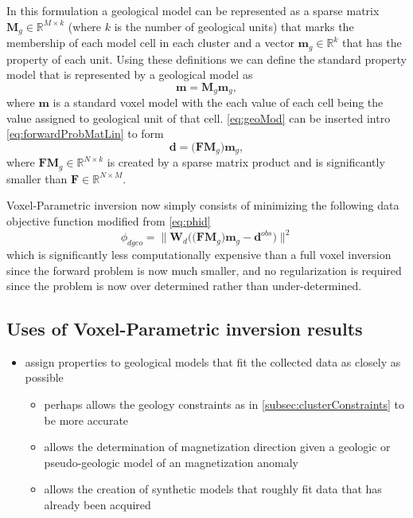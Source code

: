 In this formulation a geological model can be represented as a sparse matrix $\mathbf{M}_g \in \mathbb R^{M\times k}$ (where $k$ is the number of geological units) that marks the membership of each model cell in each cluster and a vector $\mathbf m_g \in \mathbb R^{k}$ that has the property of each unit. Using these definitions we can define the standard property model that is represented by a geological model as
\begin{equation}
\mathbf m = \mathbf M_g\mathbf m_g, \label{eq:geoMod}
\end{equation}
where $\mathbf m$ is a standard voxel model with the each value of each cell being the value assigned to geological unit of that cell. \autoref{eq:geoMod} can be inserted intro \autoref{eq:forwardProbMatLin} to form 
\begin{equation}
\mathbf d = \big(\mathbf F\mathbf M_g\big)\mathbf m_g, \label{eq:forwardProbMatLinGeo}
\end{equation}
where $\mathbf F\mathbf M_g \in \mathbb R^{N\times k}$ is created by a sparse matrix product and is significantly smaller than $\mathbf F \in \mathbb R^{N\times M}$.

Voxel-Parametric inversion now simply consists of minimizing the following data objective function modified from \autoref{eq:phid}
\begin{equation}
\phi_{d geo} =\|\mathbf W_d\Big(\big(\mathbf F\mathbf M_g\big)\mathbf m_g - \mathbf d^{obs}\Big)\|^2
\end{equation}
\label{eq:phidGeo}
which is significantly less computationally expensive than a full voxel inversion since the forward problem is now much smaller, and no regularization is required since the problem is now over determined rather than under-determined.

\subsection{Uses of Voxel-Parametric inversion results}
\label{subsec:voxelParamUses}

 \begin{itemize}
  \item assign properties to geological models that fit the collected data as closely as possible
  \begin{itemize}
   \item perhaps allows the geology constraints as in \autoref{subsec:clusterConstraints} to be more accurate
   \item allows the determination of magnetization direction given a geologic or pseudo-geologic model of an magnetization anomaly   
   \item allows the creation of synthetic models that roughly fit data that has already been acquired
  \end{itemize}
 \end{itemize}

